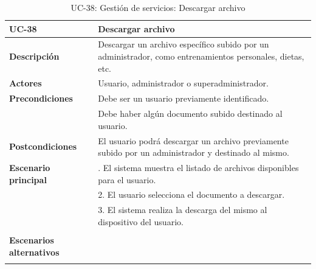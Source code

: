 \begin{table}
  \begin{center}
    \begin{tabularx}{16.4cm}{|l|X|}
      \hline
      \textbf{UC-38} & \textbf{Descargar archivo}\\
      \hline
      \textbf{Descripción} & Descargar un archivo específico subido por un administrador, como entrenamientos personales, dietas, etc. \\
      \hline
      \textbf{Actores} & Usuario, administrador o superadministrador.\\
      \hline
      \textbf{Precondiciones} & Debe ser un usuario previamente identificado.\\
      & Debe haber algún documento subido destinado al usuario.\\
      \hline
      \textbf{Postcondiciones} & El usuario podrá descargar un archivo previamente subido por un administrador y destinado al mismo.\\
      \hline
      \textbf{Escenario principal} & \smallskip 1. El sistema muestra el listado de archivos disponibles para el usuario.\\
      & 2. El usuario selecciona el documento a descargar.\\
      & 3. El sistema realiza la descarga del mismo al dispositivo del usuario.\\
      & \\
      \hline
      \textbf{Escenarios alternativos} & \\
      & \\
      \hline
    \end{tabularx}
    \caption{UC-38: Gestión de servicios: Descargar archivo}
    \label{tab:CU-descargar-archivo}

  \end{center}
\end{table}


